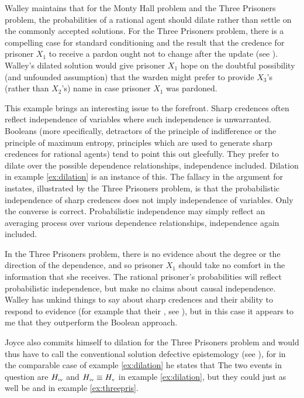 \documentclass[12pt]{article}
\begin{document}
Walley maintains that for the Monty Hall problem and the Three
Prisoners problem, the probabilities of a rational agent should dilate
rather than settle on the commonly accepted solutions. For the Three
Prisoners problem, there is a compelling case for standard
conditioning and the result that the credence for prisoner $X_{1}$ to
receive a pardon ought not to change after the update (see
). Walley's dilated solution would give
prisoner $X_{1}$ hope on the doubtful possibility (and unfounded
assumption) that the warden might prefer to provide $X_{3}$'s (rather
than $X_{2}$'s) name in case prisoner $X_{1}$ was pardoned.

This example brings an interesting issue to the forefront. Sharp
credences often reflect independence of variables where such
independence is unwarranted. Booleans (more specifically, detractors
of the principle of indifference or the principle of maximum entropy,
principles which are used to generate sharp credences for rational
agents) tend to point this out gleefully. They prefer to dilate over
the possible dependence relationships, independence included. Dilation
in example \ref{ex:dilation} is an instance of this. The fallacy in
the argument for instates, illustrated by the Three Prisoners problem,
is that the probabilistic independence of sharp credences does not
imply independence of variables. Only the converse is correct.
Probabilistic independence may simply reflect an averaging process
over various dependence relationships, independence again included.

In the Three Prisoners problem, there is no evidence about the degree
or the direction of the dependence, and so prisoner $X_{1}$ should
take no comfort in the information that she receives. The rational
prisoner's probabilities will reflect probabilistic independence, but
make no claims about causal independence. Walley has unkind things to
say about sharp credences and their ability to respond to evidence
(for example that their ,
see ), but in this case it appears to me that
they outperform the Boolean approach.

Joyce also commits himself to dilation for the Three Prisoners problem
and would thus have to call the conventional solution defective
epistemology (see ), for in the comparable case
of example \ref{ex:dilation} he states that   The two events
in question are $H_{\mbox{\tiny{iv}}}$ and
$H_{\mbox{\tiny{iv}}}\equiv{}H_{\mbox{\tiny{v}}}$ in example
\ref{ex:dilation}, but they could just as well be  and  in
example \ref{ex:threepris}.
\end{document}
